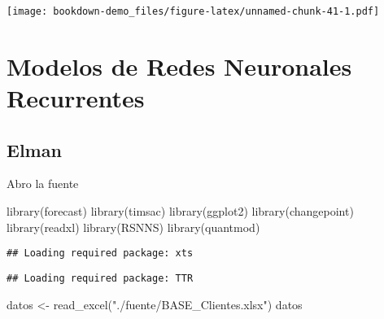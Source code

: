 \documentclass[
]{book}
\newenvironment{Shaded}{\begin{snugshade}}{\end{snugshade}}
\newcommand{\FunctionTok}[1]{\textcolor[rgb]{0.00,0.00,0.00}{#1}}
\newcommand{\NormalTok}[1]{#1}
\newcommand{\OtherTok}[1]{\textcolor[rgb]{0.56,0.35,0.01}{#1}}
\newcommand{\StringTok}[1]{\textcolor[rgb]{0.31,0.60,0.02}{#1}}
\begin{document}
\texttt{[image: bookdown-demo\_files/figure-latex/unnamed-chunk-41-1.pdf]}

\hypertarget{modelos-de-redes-neuronales-recurrentes}{%
\chapter{Modelos de Redes Neuronales Recurrentes}\label{modelos-de-redes-neuronales-recurrentes}}

\hypertarget{elman}{%
\section{Elman}\label{elman}}

Abro la fuente

\begin{Shaded}
\begin{Highlighting}[]
\FunctionTok{library}\NormalTok{(forecast)}
\FunctionTok{library}\NormalTok{(timsac)}
\FunctionTok{library}\NormalTok{(ggplot2)}
\FunctionTok{library}\NormalTok{(changepoint)}
\FunctionTok{library}\NormalTok{(readxl)}
\FunctionTok{library}\NormalTok{(RSNNS)}
\FunctionTok{library}\NormalTok{(quantmod)}
\end{Highlighting}
\end{Shaded}

\begin{verbatim}
## Loading required package: xts
\end{verbatim}

\begin{verbatim}
## Loading required package: TTR
\end{verbatim}

\begin{Shaded}
\begin{Highlighting}[]
\NormalTok{datos }\OtherTok{\textless{}{-}} \FunctionTok{read\_excel}\NormalTok{(}\StringTok{"./fuente/BASE\_Clientes.xlsx"}\NormalTok{)}
\NormalTok{datos}
\end{Highlighting}
\end{Shaded}
\end{document}
